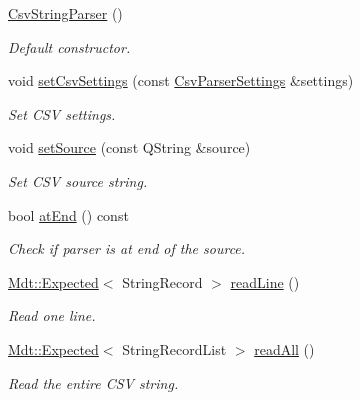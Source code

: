 \begin{DoxyCompactItemize}
\item 
\hyperlink{class_mdt_1_1_plain_text_1_1_csv_string_parser_a5a6afeedd8f074afe78fd5f161a06140}{Csv\+String\+Parser} ()\hypertarget{class_mdt_1_1_plain_text_1_1_csv_string_parser_a5a6afeedd8f074afe78fd5f161a06140}{}\label{class_mdt_1_1_plain_text_1_1_csv_string_parser_a5a6afeedd8f074afe78fd5f161a06140}

\begin{DoxyCompactList}\small\item\em Default constructor. \end{DoxyCompactList}\item 
void \hyperlink{class_mdt_1_1_plain_text_1_1_csv_string_parser_a30af818bc2d40ac11e29562e2dd19108}{set\+Csv\+Settings} (const \hyperlink{class_mdt_1_1_plain_text_1_1_csv_parser_settings}{Csv\+Parser\+Settings} \&settings)
\begin{DoxyCompactList}\small\item\em Set C\+SV settings. \end{DoxyCompactList}\item 
void \hyperlink{class_mdt_1_1_plain_text_1_1_csv_string_parser_a671b38b46afd066a71677b7cdebdc154}{set\+Source} (const Q\+String \&source)
\begin{DoxyCompactList}\small\item\em Set C\+SV source string. \end{DoxyCompactList}\item 
bool \hyperlink{class_mdt_1_1_plain_text_1_1_csv_string_parser_a81d09c21ee3fdbc499e584d799e3a3ab}{at\+End} () const \hypertarget{class_mdt_1_1_plain_text_1_1_csv_string_parser_a81d09c21ee3fdbc499e584d799e3a3ab}{}\label{class_mdt_1_1_plain_text_1_1_csv_string_parser_a81d09c21ee3fdbc499e584d799e3a3ab}

\begin{DoxyCompactList}\small\item\em Check if parser is at end of the source. \end{DoxyCompactList}\item 
\hyperlink{class_mdt_1_1_expected}{Mdt\+::\+Expected}$<$ String\+Record $>$ \hyperlink{class_mdt_1_1_plain_text_1_1_csv_string_parser_a4089cbf5a42d66903247c4bd5633e3fb}{read\+Line} ()
\begin{DoxyCompactList}\small\item\em Read one line. \end{DoxyCompactList}\item 
\hyperlink{class_mdt_1_1_expected}{Mdt\+::\+Expected}$<$ String\+Record\+List $>$ \hyperlink{class_mdt_1_1_plain_text_1_1_csv_string_parser_a9bed7245aaadf05eccc231df11a7a9e1}{read\+All} ()
\begin{DoxyCompactList}\small\item\em Read the entire C\+SV string. \end{DoxyCompactList}\end{DoxyCompactItemize}


